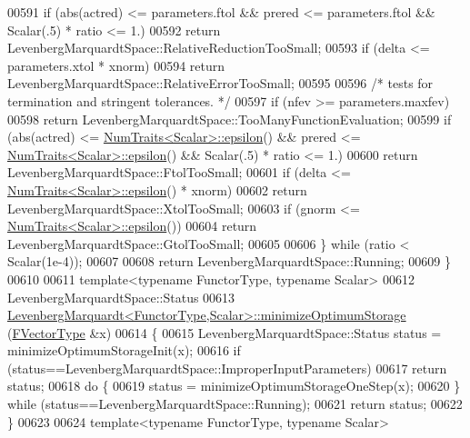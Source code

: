 \begin{DoxyCode}
00591         \textcolor{keywordflow}{if} (abs(actred) <= parameters.ftol && prered <= parameters.ftol && Scalar(.5) * ratio <= 1.)
00592             \textcolor{keywordflow}{return} LevenbergMarquardtSpace::RelativeReductionTooSmall;
00593         \textcolor{keywordflow}{if} (delta <= parameters.xtol * xnorm)
00594             \textcolor{keywordflow}{return} LevenbergMarquardtSpace::RelativeErrorTooSmall;
00595 
00596         \textcolor{comment}{/* tests for termination and stringent tolerances. */}
00597         \textcolor{keywordflow}{if} (nfev >= parameters.maxfev)
00598             \textcolor{keywordflow}{return} LevenbergMarquardtSpace::TooManyFunctionEvaluation;
00599         \textcolor{keywordflow}{if} (abs(actred) <= \hyperlink{group___core___module_struct_eigen_1_1_num_traits}{NumTraits<Scalar>::epsilon}() && prered <= 
      \hyperlink{group___core___module_struct_eigen_1_1_num_traits}{NumTraits<Scalar>::epsilon}() && Scalar(.5) * ratio <= 1.)
00600             \textcolor{keywordflow}{return} LevenbergMarquardtSpace::FtolTooSmall;
00601         \textcolor{keywordflow}{if} (delta <= \hyperlink{group___core___module_struct_eigen_1_1_num_traits}{NumTraits<Scalar>::epsilon}() * xnorm)
00602             \textcolor{keywordflow}{return} LevenbergMarquardtSpace::XtolTooSmall;
00603         \textcolor{keywordflow}{if} (gnorm <= \hyperlink{group___core___module_struct_eigen_1_1_num_traits}{NumTraits<Scalar>::epsilon}())
00604             \textcolor{keywordflow}{return} LevenbergMarquardtSpace::GtolTooSmall;
00605 
00606     \} \textcolor{keywordflow}{while} (ratio < Scalar(1e-4));
00607 
00608     \textcolor{keywordflow}{return} LevenbergMarquardtSpace::Running;
00609 \}
00610 
00611 \textcolor{keyword}{template}<\textcolor{keyword}{typename} FunctorType, \textcolor{keyword}{typename} Scalar>
00612 LevenbergMarquardtSpace::Status
00613 \hyperlink{class_eigen_1_1_levenberg_marquardt}{LevenbergMarquardt<FunctorType,Scalar>::minimizeOptimumStorage}
      (\hyperlink{group___core___module}{FVectorType}  &x)
00614 \{
00615     LevenbergMarquardtSpace::Status status = minimizeOptimumStorageInit(x);
00616     \textcolor{keywordflow}{if} (status==LevenbergMarquardtSpace::ImproperInputParameters)
00617         \textcolor{keywordflow}{return} status;
00618     \textcolor{keywordflow}{do} \{
00619         status = minimizeOptimumStorageOneStep(x);
00620     \} \textcolor{keywordflow}{while} (status==LevenbergMarquardtSpace::Running);
00621     \textcolor{keywordflow}{return} status;
00622 \}
00623 
00624 \textcolor{keyword}{template}<\textcolor{keyword}{typename} FunctorType, \textcolor{keyword}{typename} Scalar>

\end{DoxyCode}
